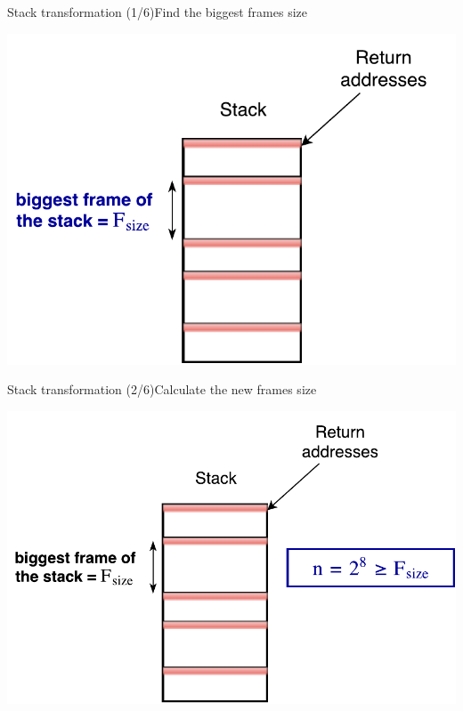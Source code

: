 \documentclass{beamer}
\begin{document}
\begin{frame}[c]{Stack transformation (1/6)}{Find the biggest frames size}
	\begin{center}
		\includegraphics[height=0.6\textheight]{images/stack_transfo_0.pdf}
	\end{center}
\end{frame}
\begin{frame}[c]{Stack transformation (2/6)}{Calculate the new frames size}
	\begin{center}
		\includegraphics[height=0.6\textheight]{images/stack_transfo_1.pdf}
	\end{center}
\end{frame}
\end{document}
